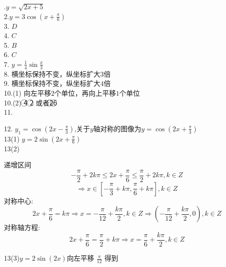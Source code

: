 \documentclass[12pt,answers]{exam}
\begin{document}
.$y=\sqrt{2x+5}$ \\ 
2.$y=3\cos{(x+\frac{\pi}{6})}$\\
3. $D$ \\
4. $C$\\
5. $B$\\
6. $C$ \\ 
7. $y=\frac{1}{4}\sin{\frac{x}{3}}$ \\
8. 横坐标保持不变，纵坐标扩大$3$倍\\
9. 横坐标保持不变，纵坐标扩大$4$倍\\
10.(1) 向左平移$2$个单位，再向上平移$1$个单位\\
10.(2)  \textcircled{4} \textcircled{2} 或者\textcircled{2}\textcircled{6}\\
11.
12. $y_1 =\cos{(2x-\frac{\pi}{3})}$,关于$y$轴对称的图像为$y=\cos{(2x+\frac{\pi}{3})}$ \\
13(1) $y=2\sin(2x+\frac{\pi}{6})$ \\
13(2)
\begin{solution}
递增区间
 \[-\frac{\pi}{2}+2k\pi \le 2x+\frac{\pi}{6}\le \frac{\pi}{2}+2k\pi ,k\in Z\]
 \[\Longrightarrow x\in [-\frac{\pi}{3}+k\pi,\frac{\pi}{6}+k\pi],k\in Z\] 
 对称中心: $$2x+\frac{\pi}{6}=k\pi \Longrightarrow x=-\frac{\pi}{12}+\frac{k\pi}{2},k\in Z \Longrightarrow (-\frac{\pi}{12}+\frac{k\pi}{2},0),k\in Z$$
 对称轴方程:
 $$2x+\frac{\pi}{6}=\frac{\pi}{2}+k\pi \Longrightarrow x= \frac{\pi}{6}+\frac{k\pi}{2},k\in Z$$
\end{solution}
13(3)$y=2\sin{(2x)}$向左平移 $\frac{\pi}{12}$ 得到
\end{document}
